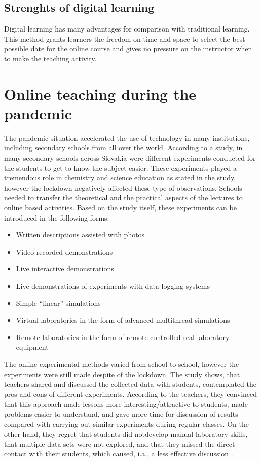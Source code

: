 \documentclass[10pt,oneside,english,a4paper]{article}
\begin{document}
\subsection{Strenghts of digital learning}\label{3.4}

	Digital learning has many advantages for comparison with traditional learning. This method grants learners the freedom on time and space to select the best possible date for the online course and gives no pressure on the instructor when to make the teaching activity.  \cite{Lin2017}


\section{Online teaching during the pandemic}\label{covid}

	The pandemic situation accelerated the use of technology in many institutions, including secondary schools from all over the world. According to a study\cite{Babinkov2020}, in many secondary schools across Slovakia were different experiments conducted for the students to get to know the subject easier. These experiments played a tremendous role in chemistry and science education as stated in the study, however the lockdown negatively affected these type of observations. Schools needed to transfer the theoretical and the practical aspects of the lectures to online based activities. Based on the study itself\cite{Babinkov2020}, these experiments can be introduced in the following forms:
\begin{itemize}
\item Written descriptions assisted with photos
\item Video-recorded demonstrations
\item Live interactive demonstrations
\item Live demonstrations of experiments with data logging systems
\item Simple “linear” simulations
\item Virtual laboratories in the form of advanced multithread simulations
\item Remote laboratories in the form of remote-controlled real laboratory equipment
\end{itemize}

	The online experimental methods varied from school to school, however the experiments were still made despite of the lockdown. The study shows, that teachers shared and discussed the collected data with students, contemplated the pros and cons of different experiments. According to the teachers, they convinced that this approach made lessons more interesting/attractive to students, made problems easier to understand, and gave more time for discussion of results  compared with carrying out similar experiments during regular classes. On the other hand, they regret that students did notdevelop manual laboratory skills, that multiple data sets were not explored, and that they missed the direct contact with their students, which caused, i.a., a less effective discussion \cite{Babinkov2020}.
\end{document}
